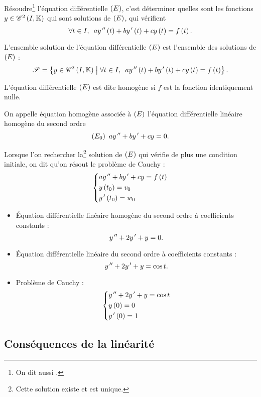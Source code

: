 Résoudre\footnote{On dit aussi .} l'équation différentielle \(\left(E\right)\), c'est déterminer quelles sont les fonctions \(y\in\mathscr{C}^{2}\left(I,\mathbb{K}\right)\) qui sont solutions de \(\left(E\right)\), \cad qui vérifient \[\quantifs{\forall t\in I}ay\seconde\paren{t}+by\prim\paren{t}+cy\paren{t}=f\paren{t}.\]

L'ensemble solution de l'équation différentielle \(\left(E\right)\) est l'ensemble des solutions de \(\left(E\right)\) : \[\fami{S}=\accol{y\in\ensclasse{2}{I}{\K}\tq\quantifs{\forall t\in I}ay\seconde\paren{t}+by\prim\paren{t}+cy\paren{t}=f\paren{t}}.\]

L'équation différentielle \(\left(E\right)\) est dite homogène si \(f\) est la fonction identiquement nulle.

On appelle équation homogène associée à \(\left(E\right)\) l'équation différentielle linéaire homogène du second ordre \[\left(E_0\right)~ay^{\,\prime\prime}+by^{\,\prime}+cy=0.\]

Lorsque l'on rechercher la\footnote{Cette solution existe et est unique.} solution de \(\left(E\right)\) qui vérifie de plus une condition initiale, on dit qu'on résout le problème de Cauchy : \[\begin{dcases}
ay^{\,\prime\prime}+by^{\,\prime}+cy=f\left(t\right) \\
y\left(t_0\right)=v_0 \\
y^{\,\prime}\left(t_0\right)=w_0
\end{dcases}\]

\begin{ex}
\begin{itemize}
\item Équation différentielle linéaire homogène du second ordre à coefficients constants : \[y^{\,\prime\prime}+2y^{\,\prime}+y=0.\]

\item Équation différentielle linéaire du second ordre à coefficients constants : \[y^{\,\prime\prime}+2y^{\,\prime}+y=\cos t.\]

\item Problème de Cauchy : \[\begin{dcases}
y^{\,\prime\prime}+2y^{\,\prime}+y=\cos t \\
y\left(0\right)=0 \\
y^{\,\prime}\left(0\right)=1
\end{dcases}\]
\end{itemize}
\end{ex}

\subsection{Conséquences de la linéarité}

